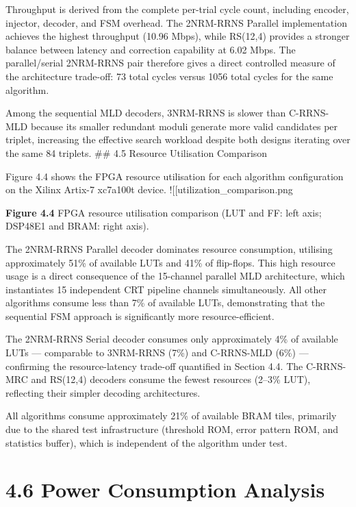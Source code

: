 \documentclass[
  12pt,
  a4paper]{report}
\begin{document}
Throughput is derived from the complete per-trial cycle count, including
encoder, injector, decoder, and FSM overhead. The 2NRM-RRNS Parallel
implementation achieves the highest throughput (10.96 Mbps), while
RS(12,4) provides a stronger balance between latency and correction
capability at 6.02 Mbps. The parallel/serial 2NRM-RRNS pair therefore
gives a direct controlled measure of the architecture trade-off: 73
total cycles versus 1056 total cycles for the same algorithm.

Among the sequential MLD decoders, 3NRM-RRNS is slower than C-RRNS-MLD
because its smaller redundant moduli generate more valid candidates per
triplet, increasing the effective search workload despite both designs
iterating over the same 84 triplets. \#\# 4.5 Resource Utilisation
Comparison

Figure 4.4 shows the FPGA resource utilisation for each algorithm
configuration on the Xilinx Artix-7 xc7a100t device.
!{[}{[}utilization\_comparison.png\textbar547{]}{]}

\textbf{Figure 4.4} FPGA resource utilisation comparison (LUT and FF:
left axis; DSP48E1 and BRAM: right axis).

The 2NRM-RRNS Parallel decoder dominates resource consumption, utilising
approximately 51\% of available LUTs and 41\% of flip-flops. This high
resource usage is a direct consequence of the 15-channel parallel MLD
architecture, which instantiates 15 independent CRT pipeline channels
simultaneously. All other algorithms consume less than 7\% of available
LUTs, demonstrating that the sequential FSM approach is significantly
more resource-efficient.

The 2NRM-RRNS Serial decoder consumes only approximately 4\% of
available LUTs --- comparable to 3NRM-RRNS (7\%) and C-RRNS-MLD (6\%)
--- confirming the resource-latency trade-off quantified in Section 4.4.
The C-RRNS-MRC and RS(12,4) decoders consume the fewest resources
(2--3\% LUT), reflecting their simpler decoding architectures.

All algorithms consume approximately 21\% of available BRAM tiles,
primarily due to the shared test infrastructure (threshold ROM, error
pattern ROM, and statistics buffer), which is independent of the
algorithm under test.

\section{4.6 Power Consumption
Analysis}\label{power-consumption-analysis}
\end{document}
